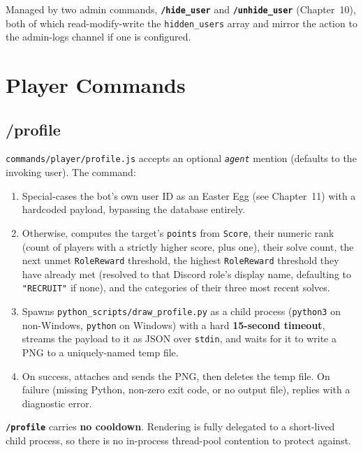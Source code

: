 \documentclass[12pt,a4paper]{report}
\newcommand{\cmd}[1]{\texttt{\color{cybercyan}\textbf{#1}}}
\newcommand{\param}[1]{\texttt{\color{cyberdark}\textit{#1}}}
\newcommand{\file}[1]{\texttt{\color{cyberpurple!80!black}#1}}
\newcommand{\note}[1]{
    \begin{tcolorbox}[colback=cyberblue!5, colframe=cyberblue,
        title=\textbf{NOTE}, fonttitle=\sffamily\small]
    #1
    \end{tcolorbox}
}
\begin{document}
Managed by two admin commands, \cmd{/hide\_user} and \cmd{/unhide\_user} (Chapter~10), both of
which read-modify-write the \texttt{hidden\_users} array and mirror the action to the admin-logs
channel if one is configured.

\chapter{Player Commands}

\section{/profile}

\texttt{commands/player/profile.js} accepts an optional \param{agent} mention (defaults to the
invoking user). The command:

\begin{enumerate}
    \item Special-cases the bot's own user ID as an Easter Egg (see Chapter~11) with a hardcoded
          payload, bypassing the database entirely.
    \item Otherwise, computes the target's \texttt{points} from \texttt{Score}, their numeric rank
          (count of players with a strictly higher score, plus one), their solve count, the next
          unmet \texttt{RoleReward} threshold, the highest \texttt{RoleReward} threshold they have
          already met (resolved to that Discord role's display name, defaulting to
          \texttt{"RECRUIT"} if none), and the categories of their three most recent solves.
    \item Spawns \file{python\_scripts/draw\_profile.py} as a child process (\texttt{python3} on
          non-Windows, \texttt{python} on Windows) with a hard \textbf{15-second timeout}, streams
          the payload to it as JSON over \texttt{stdin}, and waits for it to write a PNG to a
          uniquely-named temp file.
    \item On success, attaches and sends the PNG, then deletes the temp file. On failure (missing
          Python, non-zero exit code, or no output file), replies with a diagnostic error.
\end{enumerate}

\note{\cmd{/profile} carries \textbf{no cooldown}. Rendering is fully delegated to a short-lived
child process, so there is no in-process thread-pool contention to protect against.}
\end{document}
